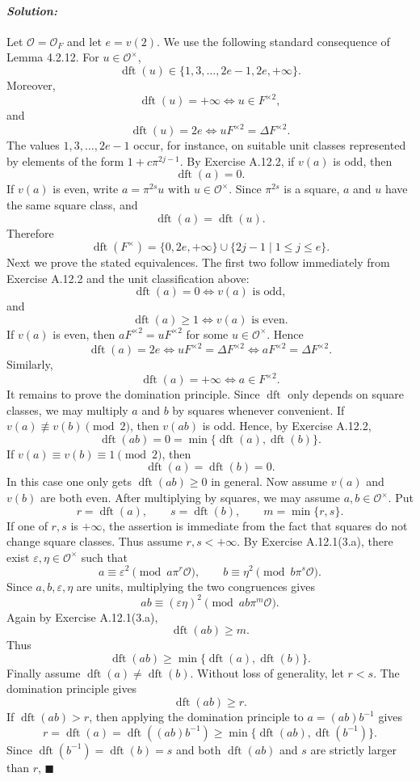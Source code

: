 \documentclass[12pt, a4paper]{article}
\newenvironment{solution}
  {\paragraph{\textit{Solution:}}\par\medskip}
  {\hfill$\blacksquare$\vspace{0.1cm}}
\begin{document}
\begin{solution}
    Let $\mathcal O=\mathcal O_F$ and let $e=v(2)$. We use the following standard consequence of Lemma 4.2.12. For $u\in \mathcal O^\times$, \[ \operatorname{dft}(u)\in \{1,3,\dots,2e-1,2e,+\infty\}. \] Moreover, \[ \operatorname{dft}(u)=+\infty \Longleftrightarrow u\in F^{\times 2}, \] and \[ \operatorname{dft}(u)=2e \Longleftrightarrow uF^{\times 2}=\Delta F^{\times 2}. \] The values $1,3,\dots,2e-1$ occur, for instance, on suitable unit classes represented by elements of the form $1+c\pi^{2j-1}$. By Exercise A.12.2, if $v(a)$ is odd, then \[ \operatorname{dft}(a)=0. \] If $v(a)$ is even, write $a=\pi^{2s}u$ with $u\in\mathcal O^\times$. Since $\pi^{2s}$ is a square, $a$ and $u$ have the same square class, and \[ \operatorname{dft}(a)=\operatorname{dft}(u). \] Therefore \[ \operatorname{dft}(F^\times) = \{0,2e,+\infty\} \cup \{2j-1\mid 1\leq j\leq e\}. \] Next we prove the stated equivalences. The first two follow immediately from Exercise A.12.2 and the unit classification above: \[ \operatorname{dft}(a)=0 \Longleftrightarrow v(a)\text{ is odd}, \] and \[ \operatorname{dft}(a)\geq 1 \Longleftrightarrow v(a)\text{ is even}. \] If $v(a)$ is even, then $aF^{\times 2}=uF^{\times 2}$ for some $u\in\mathcal O^\times$. Hence \[ \operatorname{dft}(a)=2e \Longleftrightarrow uF^{\times 2}=\Delta F^{\times 2} \Longleftrightarrow aF^{\times 2}=\Delta F^{\times 2}. \] Similarly, \[ \operatorname{dft}(a)=+\infty \Longleftrightarrow a\in F^{\times 2}. \] It remains to prove the domination principle. Since $\operatorname{dft}$ only depends on square classes, we may multiply $a$ and $b$ by squares whenever convenient. If $v(a)\not\equiv v(b)\pmod 2$, then $v(ab)$ is odd. Hence, by Exercise A.12.2, \[ \operatorname{dft}(ab)=0 = \min\{\operatorname{dft}(a),\operatorname{dft}(b)\}. \] If $v(a)\equiv v(b)\equiv 1\pmod 2$, then \[ \operatorname{dft}(a)=\operatorname{dft}(b)=0. \] In this case one only gets $\operatorname{dft}(ab)\geq 0$ in general. Now assume $v(a)$ and $v(b)$ are both even. After multiplying by squares, we may assume $a,b\in\mathcal O^\times$. Put \[ r=\operatorname{dft}(a), \qquad s=\operatorname{dft}(b), \qquad m=\min\{r,s\}. \] If one of $r,s$ is $+\infty$, the assertion is immediate from the fact that squares do not change square classes. Thus assume $r,s<+\infty$. By Exercise A.12.1(3.a), there exist $\varepsilon,\eta\in\mathcal O^\times$ such that \[ a\equiv \varepsilon^2 \pmod{a\pi^r\mathcal O}, \qquad b\equiv \eta^2 \pmod{b\pi^s\mathcal O}. \] Since $a,b,\varepsilon,\eta$ are units, multiplying the two congruences gives \[ ab\equiv (\varepsilon\eta)^2 \pmod{ab\pi^m\mathcal O}. \] Again by Exercise A.12.1(3.a), \[ \operatorname{dft}(ab)\geq m. \] Thus \[ \operatorname{dft}(ab) \geq \min\{\operatorname{dft}(a),\operatorname{dft}(b)\}. \] Finally assume $\operatorname{dft}(a)\neq\operatorname{dft}(b)$. Without loss of generality, let $r<s$. The domination principle gives \[ \operatorname{dft}(ab)\geq r. \] If $\operatorname{dft}(ab)>r$, then applying the domination principle to $a=(ab)b^{-1}$ gives \[ r=\operatorname{dft}(a) = \operatorname{dft}((ab)b^{-1}) \geq \min\{\operatorname{dft}(ab),\operatorname{dft}(b^{-1})\}. \] Since $\operatorname{dft}(b^{-1})=\operatorname{dft}(b)=s$ and both $\operatorname{dft}(ab)$ and $s$ are strictly larger than $r$, 
\end{solution}
\end{document}
